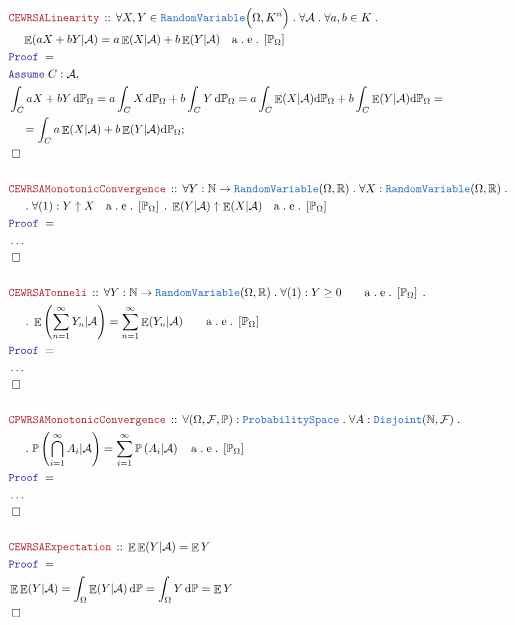 \documentclass[12pt]{scrartcl}
\newcommand{\TYPE}[1]{\textcolor{NavyBlue}{\mathtt{#1}}}
\newcommand{\LOGIC}[1]{\textcolor{Blue}{\mathtt{#1}}}
\newcommand{\THM}[1]{\textcolor{Maroon}{\mathtt{#1}}}
\renewcommand{\.}{\; . \;}
\newcommand{\Theorem}[2]{& \THM{#1} \, :: \, #2 \\ & \Proof = \\ }
\newcommand{\NewLine}{\\ & \kern 1pc}
\newcommand{\Page}[1]{\begin{align*} #1 \end{align*}   }
\newcommand{\NoProof}{ & \ldots \\ \EndProof}
\newcommand{\Reals}{\mathbb{R} }
\newcommand{\Nat}{\mathbb{N} }
\newcommand{\A}{\LOGIC{Assume} \;}
\newcommand{\Assume}[2]{& \A #1 : #2, \\}
\newcommand{\QED}{\; \square}
\newcommand{\EndProof}{& \QED \\}
\newcommand{\Proof}{\LOGIC{Proof} \; }
\renewcommand{\AE}[1]{\quad \mathrm{a\. e\.} \left[#1\right] }
\newcommand{\F}{\mathcal{F}}
\renewcommand{\O}{\Omega}
\renewcommand{\P}{\mathbb{P}}
\newcommand{\RV}{\TYPE{RandomVariable}}
\DeclareMathOperator*{\Exp}{\mathbb{E}}
\begin{document}
\Page{
	\Theorem{CEWRSALinearity}{
		\forall X,Y \in \RV\Big( \O, K^n \Big) \. \forall \mathcal{A} \. \forall a,b \in K \. \NewLine
		\Exp( aX + bY | \mathcal{A}  ) = a\Exp(X|\mathcal{A}) + b\Exp(Y|\mathcal{A}) \AE{\P_\O}
	}
	\Assume{C}{\mathcal{A}}
	&   \int_C aX + bY \, \mathrm{d}\P_\O  = a\int_C X \, \mathrm{d}\P_\O + b\int_C Y \, \mathrm{d}\P_\O  = a \int_C \Exp(X|\mathcal{A}) \mathrm{d}\P_\O + b \int_C \Exp(Y|\mathcal{A})\mathrm{d}\P_\O 
	= \NewLine	= \int_C a\Exp(X|\mathcal{A}) + b\Exp(Y|\mathcal{A}) \mathrm{d} \P_\O   ;                    \\
	\EndProof
	\\
	\Theorem{CEWRSAMonotonicConvergence}{ \forall Y : \Nat \to \RV(\O,\Reals) \. \forall X : \RV(\O,\Reals) \.  
		\NewLine \. \forall (1) : Y \uparrow X  \AE{\P_\O}\. \Exp(Y|\mathcal{A}) \uparrow \Exp(X|\mathcal{A})  \AE{\P_\O} }
	\NoProof
	\\
	\Theorem{CEWRSATonneli}{\forall Y : \Nat \to \RV(\O,\Reals) \. \forall (1) : Y \ge 0 \quad \AE{\P_\O} \. 
		\NewLine \.
		\Exp\left( \sum^\infty_{n = 1} Y_n | \mathcal{A}  \right) = \sum^\infty_{n=1} \Exp( Y_n | \mathcal{A} ) \quad \AE{\P_\O}
	}
	\NoProof
	\\
	\Theorem{CPWRSAMonotonicConvergence}{ 
		\forall (\O,\F,\P) : \TYPE{ProbabilitySpace} \. \forall A : \TYPE{Disjoint}(\Nat,\F) \. 
		\NewLine \.
		\P\left( \bigcap^\infty_{i=1} A_i | \mathcal{A} \right)  = \sum^\infty_{i=1} \P\left( A_i | \mathcal{A}  \right) 
		\AE{\P_\O}
	}
	\NoProof
	\\
	\Theorem{CEWRSAExpectation}{\Exp \Exp(Y|\mathcal{A}) = \Exp Y}
	& \Exp \Exp (Y|\mathcal{A}) = \int_\O \Exp (Y|\mathcal{A}) \, \mathrm{d}\P = \int_\O Y \, \mathrm{d}\P = \Exp Y  \\
	\EndProof
}
\end{document}
